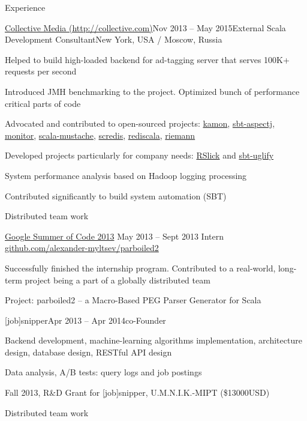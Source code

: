 \documentclass{resume} %
\begin{document}
\begin{rSection}{Experience}
\begin{rSubsection}{\href{http://collective.com}{Collective Media 
(http://collective.com)}}{Nov 2013 -- May 2015}{External Scala Development Consultant}{New 
York, USA / Moscow, Russia}
\item Helped to build high-loaded backend for ad-tagging server that serves 100K+ requests per second
\item Introduced JMH benchmarking to the project. Optimized bunch of performance critical parts of code
\item Advocated and contributed to open-sourced projects: \href{https://github.com/kamon-io/Kamon}{kamon}, \href{https://github.com/sbt/sbt-aspectj}{sbt-aspectj}, \href{https://github.com/eigengo/monitor}{monitor}, \href{https://github.com/vspy/scala-mustache}{scala-mustache}, \href{https://github.com/Livestream/scredis}{scredis}, \href{https://github.com/etaty/rediscala}{rediscala}, \href{https://github.com/aphyr/riemann}{riemann}
\item Developed projects particularly for company needs: \href{http://github.com/alexander-myltsev/RSlick}{RSlick} and \href{http://github.com/alexander-myltsev/sbt-uglify}{sbt-uglify}
\item System performance analysis based on Hadoop logging processing
\item Contributed significantly to build system automation (SBT)
\item Distributed team work
\end{rSubsection}


\begin{rSubsection}
 {\href{https://www.google-melange.com/archive/gsoc/2013/orgs/epfl_scala/projects/alexander__myltsev.html}
 {Google Summer of Code 2013}}
 {May 2013 -- Sept 2013}
 {Intern}
 {\href{https://github.com/alexander-myltsev/parboiled2}{github.com/alexander-myltsev/parboiled2}}
\item Successfully finished the internship program. Contributed to a real-world, long-term project 
being a part of a globally distributed team
\item Project: parboiled2 -- a Macro-Based PEG Parser Generator for Scala
\end{rSubsection}


\begin{rSubsection}{[job]snipper}{Apr 2013 -- Apr 2014}{co-Founder}{}
\item Backend development, machine-learning algorithms implementation, architecture design, database design, RESTful API design
\item Data analysis, A/B tests: query logs and job postings
\item Fall 2013, R\&D Grant for [job]snipper, U.M.N.I.K.-MIPT (\$13000USD)
\item Distributed team work
\end{rSubsection}


\end{rSection}
\end{document}
